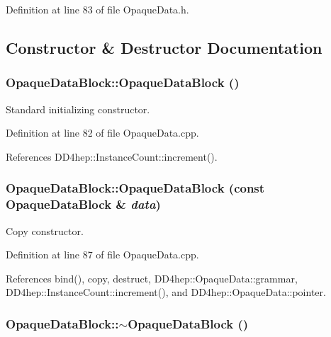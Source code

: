 Definition at line 83 of file OpaqueData.h.

\subsection{Constructor \& Destructor Documentation}
\hypertarget{class_d_d4hep_1_1_opaque_data_block_a1c0cf067c26869fcb636fbfed8002c73}{
\subsubsection[{OpaqueDataBlock}]{\setlength{\rightskip}{0pt plus 5cm}OpaqueDataBlock::OpaqueDataBlock ()}}
\label{class_d_d4hep_1_1_opaque_data_block_a1c0cf067c26869fcb636fbfed8002c73}


Standard initializing constructor. 

Definition at line 82 of file OpaqueData.cpp.

References DD4hep::InstanceCount::increment().\hypertarget{class_d_d4hep_1_1_opaque_data_block_a5c97af2f7c4130d78158040c2a95ab34}{
\subsubsection[{OpaqueDataBlock}]{\setlength{\rightskip}{0pt plus 5cm}OpaqueDataBlock::OpaqueDataBlock (const {\bf OpaqueDataBlock} \& {\em data})}}
\label{class_d_d4hep_1_1_opaque_data_block_a5c97af2f7c4130d78158040c2a95ab34}


Copy constructor. 

Definition at line 87 of file OpaqueData.cpp.

References bind(), copy, destruct, DD4hep::OpaqueData::grammar, DD4hep::InstanceCount::increment(), and DD4hep::OpaqueData::pointer.\hypertarget{class_d_d4hep_1_1_opaque_data_block_a175f12bf6af71e59c1334cbb4099b4b3}{
\subsubsection[{$\sim$OpaqueDataBlock}]{\setlength{\rightskip}{0pt plus 5cm}OpaqueDataBlock::$\sim$OpaqueDataBlock ()}}
\label{class_d_d4hep_1_1_opaque_data_block_a175f12bf6af71e59c1334cbb4099b4b3}


